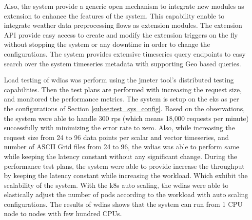 Also, the system provide a generic open mechanism to integrate new modules as extension to enhance the features of the system. This capability enable to integrate weather data preprocessing flows as extension modules.
The extension API provide easy access to create and modify the extension triggers on the fly without stopping the system or any downtime in order to change the configurations.
The system provides extensive timeseries query endpoints to easy search over the system timeseries metadata with supporting Geo based queries.

Load testing of \acrshort{wdias} was perform using the \acrshort{jmeter} tool's distributed testing capabilities. Then the test plans are performed with increasing the request size, and monitored the performance metrics. The system is setup on the \acrfull{eks} as per the configurations of Section \ref{subse:test_sys_config}. Based on the observations, the system were able to handle 300 \acrshort{rps} (which means 18,000 requests per minute) successfully with minimizing the error rate to zero. Also, while increasing the request size from 24 to 96 data points per scalar and vector timeseries, and number of ASCII Grid files from 24 to 96, the \acrshort{wdias} was able to perform same while keeping the latency constant without any significant change. During the performance test plans, the system were able to provide increase the throughput by keeping the latency constant while increasing the workload. Which exhibit the scalability of the system.
With the \acrshort{k8s} auto scaling, the \acrshort{wdias} were able to elastically adjust the number of pods according to the workload with auto scaling configurations. 
The results of \acrshort{wdias} shows that the system can run from 1 CPU node to nodes with few hundred CPUs.